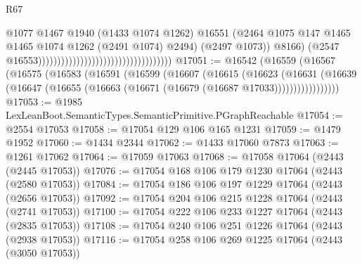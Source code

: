 \begin{lexlean}{R67}
\begin{coremodule}
                                                                            @1077
                                                                            @1467
                                                                            @1940
                                                                            (@1433 @1074 @1262)
                                                                            @16551
                                                                            (@2464
                                                                              @1075
                                                                              @147
                                                                              @1465
                                                                              @1465
                                                                              @1074
                                                                              @1262
                                                                              (@2491 @1074)
                                                                              @2494)
                                                                            (@2497 @1073))
                                                                          @8166)
                                                                        (@2547
                                                                          @16553)))))))))))))))))))))))))))))))))))
@17051 := @16542
    (@16559
      (@16567
        (@16575
          (@16583
            (@16591
              (@16599
                (@16607
                  (@16615
                    (@16623
                      (@16631
                        (@16639
                          (@16647 (@16655 (@16663 (@16671 (@16679 (@16687 @17033)))))))))))))))))
@17053 := @1985 LexLeanBoot.SemanticTypes.SemanticPrimitive.PGraphReachable
@17054 := @2554 @17053
@17058 := @17054 @129 @106 @165 @1231
@17059 := @1479 @1952
@17060 := @1434 @2344
@17062 := @1433 @17060 @7873
@17063 := @1261 @17062
@17064 := @17059 @17063
@17068 := @17058 @17064 (@2443 (@2445 @17053))
@17076 := @17054 @168 @106 @179 @1230 @17064 (@2443 (@2580 @17053))
@17084 := @17054 @186 @106 @197 @1229 @17064 (@2443 (@2656 @17053))
@17092 := @17054 @204 @106 @215 @1228 @17064 (@2443 (@2741 @17053))
@17100 := @17054 @222 @106 @233 @1227 @17064 (@2443 (@2835 @17053))
@17108 := @17054 @240 @106 @251 @1226 @17064 (@2443 (@2938 @17053))
@17116 := @17054 @258 @106 @269 @1225 @17064 (@2443 (@3050 @17053))

\end{coremodule}
\end{lexlean}

